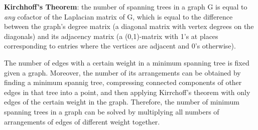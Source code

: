 
\textbf{Kirchhoff's Theorem}: the number of spanning trees in a graph G is equal to \emph{any} cofactor of the Laplacian matrix of G, which is equal to the difference between the graph's degree matrix (a diagonal matrix with vertex degrees on the diagonals) and its adjacency matrix (a (0,1)-matrix with 1's at places corresponding to entries where the vertices are adjacent and 0's otherwise).

The number of edges with a certain weight in a minimum spanning tree is fixed given a graph. Moreover, the number of its arrangements can be obtained by finding a minimum spannig tree, compressing connected components of other edges in that tree into a point, and then applying Kirrchoff's theorem with only edges of the certain weight in the graph. Therefore, the number of minimum spanning trees in a graph can be solved by multiplying all numbers of arrangements of edges of different weight together.


